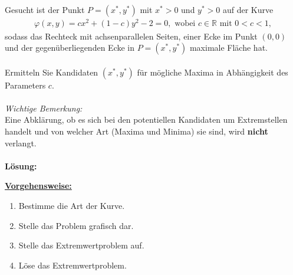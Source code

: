 \subsection*{}
Gesucht ist der Punkt $ P = (x^\ast,y^\ast) $ mit $ x^\ast > 0  $ und $ y^\ast > 0 $ auf der Kurve
\begin{align*}
\varphi(x,y) = 
cx^2 +(1-c) y^2 -2 = 0, \textrm{ wobei } c \in \mathbb{R} \textrm{ mit } 0 < c < 1,
\end{align*}
sodass das Rechteck mit achsenparallelen Seiten, einer Ecke im Punkt $ (0,0) $ und der gegenüberliegenden Ecke in $ P = (x^\ast, y^\ast) $ maximale Fläche hat.\\
\\
Ermitteln Sie Kandidaten $ (x^\ast, y^\ast) $ für mögliche Maxima in Abhängigkeit des Parameters $ c $.\\
\\
\textit{Wichtige Bemerkung:}\\
Eine Abklärung, ob es sich bei den potentiellen Kandidaten um Extremstellen handelt und von welcher Art (Maxima und Minima) sie sind, wird \textbf{nicht} verlangt.
\\ \\
\textbf{Lösung:}
\begin{mdframed}
\underline{\textbf{Vorgehensweise:}}
\renewcommand{\labelenumi}{\theenumi.}
\begin{enumerate}
\item Bestimme die Art der Kurve.
\item Stelle das Problem grafisch dar.
\item Stelle das Extremwertproblem auf.
\item Löse das Extremwertproblem. 
\end{enumerate}
\end{mdframed}

